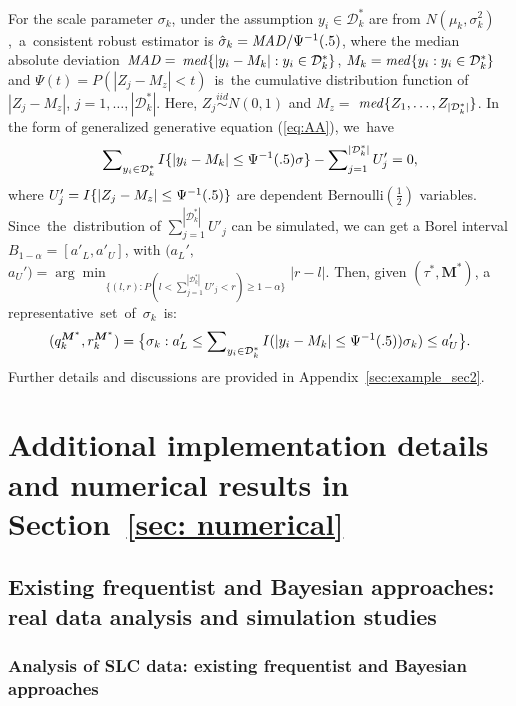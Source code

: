 \documentclass[12pt]{article}
\theoremstyle{shortspace}
\def\*#1{\bm{#1}}
\begin{document}
For the scale parameter $\sigma_k$, under the assumption  
$y_i \in {\mathcal D}_k^*$ are from $N(\mu_k, \sigma_k^2)$,~a~consistent robust estimator is $\hat \sigma_k =  {\it MAD}/\Psi^{-1}(.5)$, where the median absolute deviation~${\it MAD} =$ $ {\it med}\{|y_i - M_k|: y_i \in {\mathcal D}_k^*\}$, $M_k = {\it med}\{y_i: y_i \in {\mathcal D}_k^*\}$ and $\Psi(t) = P(|Z_j - M_z| < t)$~is~the cumulative distribution function of $|Z_j - M_z|$, $j = 1, \ldots, |{\mathcal D}_k^*|$. Here,  
$Z_j \overset{iid}{\sim} N(0,1)$ and $M_z =$ ${\it med}
\{Z_1,  \ldots, Z_{|{\mathcal D}_k^*|}\}$.
In the form of generalized generative equation (\ref{eq:AA}), we~have
$$ \sum\nolimits_{y_i \in {\mathcal D}_k^*} I\{|y_i - M_k| \leq {\small \Psi^{-1}(.5)} \sigma \} - 
\sum\nolimits_{j = 1}^{|{\mathcal D}_k^*|} U'_j = 0, 
$$
where $U'_j = I\{|Z_j - M_z| \leq {\small \Psi^{-1}(.5)}\}$ are dependent Bernoulli$(\frac12)$ variables. Since~the~distribution of $\sum\nolimits_{j = 1}^{|{\mathcal D}_k^*|} U'_j$ can be simulated, we can get 
a Borel interval  $B_{1 -\alpha} = [a'_L, a'_U]$,  
with
$(a_L',$ $ a_U') = 
     \arg \min_{\{(l,r): 
  P( l < \sum\nolimits_{j = 1}^{|{\mathcal D}_k^*|} U'_j < r )
     \geq 1- \alpha\}} |r - l|$. Then, given $(\tau^*, \*M^*)$, a  representative~set~of~$\sigma_k$~is: %
    $$(q_k^{\*M^*}, r_k^{\*M^*}) =  \big\{\sigma_k: a'_L \leq \sum\nolimits_{y_i \in {\mathcal D}_k^*} I(|y_i - M_k| \leq {\small \Psi^{-1}(.5))} \sigma_k ) \leq a'_U \big\}.$$ 
 Further details and discussions are provided in  
{Appendix~\ref{sec:example_sec2}.}

 




\section{Additional implementation details and numerical results in Section~\ref{sec: numerical}}\label{sec:numerical-details}



\subsection{Existing frequentist and Bayesian approaches: real data analysis and simulation studies} \label{sec:bayes_comp}


\subsubsection{Analysis of SLC data: existing frequentist and Bayesian approaches}
\end{document}
